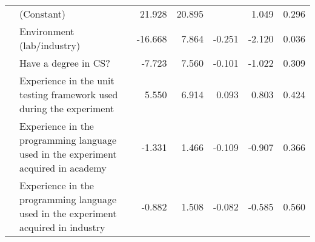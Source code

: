 \begin{table}[h]
{\begin{tabular}{|llrrrrr}
\multicolumn{1}{|l|}{}                                 & \multicolumn{1}{l|}{(Constant)}                                                                         & \multicolumn{1}{r|}{21.928}                         & \multicolumn{1}{r|}{20.895}                       & \multicolumn{1}{r|}{}                                   & \multicolumn{1}{r|}{1.049}                         & \multicolumn{1}{r|}{0.296}                           \\ \cline{2-7} 
\multicolumn{1}{|l|}{}                                 & \multicolumn{1}{l|}{{\color[HTML]{FD6864} Environment (lab/industry)}}                                  & \multicolumn{1}{r|}{{\color[HTML]{FD6864} -16.668}} & \multicolumn{1}{r|}{{\color[HTML]{FD6864} 7.864}} & \multicolumn{1}{r|}{{\color[HTML]{FD6864} -0.251}}      & \multicolumn{1}{r|}{{\color[HTML]{FD6864} -2.120}} & \multicolumn{1}{r|}{{\color[HTML]{FD6864} 0.036}}    \\ \cline{2-7} 
\multicolumn{1}{|l|}{}                                 & \multicolumn{1}{l|}{Have a degree in CS?}                                                               & \multicolumn{1}{r|}{-7.723}                         & \multicolumn{1}{r|}{7.560}                        & \multicolumn{1}{r|}{-0.101}                             & \multicolumn{1}{r|}{-1.022}                        & \multicolumn{1}{r|}{0.309}                           \\ \cline{2-7} 
\multicolumn{1}{|l|}{}                                 & \multicolumn{1}{l|}{Experience in the unit testing framework used during the experiment}                & \multicolumn{1}{r|}{5.550}                          & \multicolumn{1}{r|}{6.914}                        & \multicolumn{1}{r|}{0.093}                              & \multicolumn{1}{r|}{0.803}                         & \multicolumn{1}{r|}{0.424}                           \\ \cline{2-7} 
\multicolumn{1}{|l|}{}                                 & \multicolumn{1}{l|}{Experience in the programming language used in the experiment acquired in academy}  & \multicolumn{1}{r|}{-1.331}                         & \multicolumn{1}{r|}{1.466}                        & \multicolumn{1}{r|}{-0.109}                             & \multicolumn{1}{r|}{-0.907}                        & \multicolumn{1}{r|}{0.366}                           \\ \cline{2-7} 
\multicolumn{1}{|l|}{}                                 & \multicolumn{1}{l|}{Experience in the programming language used in the experiment acquired in industry} & \multicolumn{1}{r|}{-0.882}                         & \multicolumn{1}{r|}{1.508}                        & \multicolumn{1}{r|}{-0.082}                             & \multicolumn{1}{r|}{-0.585}                        & \multicolumn{1}{r|}{0.560}                           \\ \cline{2-7} 

\end{tabular}}
\end{table}
